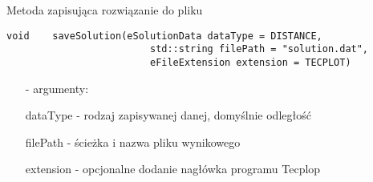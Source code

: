 \noindent Metoda zapisująca rozwiązanie do pliku
\begin{lstlisting}[style = nonumbers]
	void	saveSolution(eSolutionData dataType = DISTANCE,
	                     std::string filePath = "solution.dat",  
	                     eFileExtension extension = TECPLOT)	
\end{lstlisting}
\vspace*{-.5cm}
\begin{enumerate} \itemsep1pt \parskip0pt 
	\item[-] \textsf{argumenty:}
	\item[] dataType - rodzaj zapisywanej danej, domyślnie odległość
	\item[] filePath - ścieżka i nazwa pliku wynikowego
	\item[] extension - opcjonalne dodanie nagłówka programu Tecplop\newline
\end{enumerate} 

